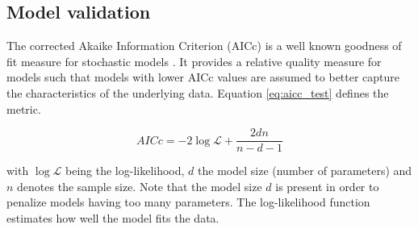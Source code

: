 %
%
%
%
%
%
%
%
%
%



\subsection{Model validation}



The corrected Akaike Information Criterion (AICc) is a well known goodness of fit measure for stochastic models \cite{weron2007modeling}. It provides a relative quality measure for models such that models with lower AICc values are assumed to better capture the characteristics of the underlying data. 
Equation \ref{eq:aicc_test} defines the metric. 

\begin{equation}
	AICc = -2 \log \mathcal{L} + \frac{2dn}{n - d - 1}
\label{eq:aicc_test}
\end{equation}

with $\log \mathcal{L}$ being the log-likelihood, $d$ the model size (number of parameters) and $n$ denotes the sample size. Note that the model size $d$ is present in order to penalize models having too many parameters. The log-likelihood function estimates how well the model fits the data. 

